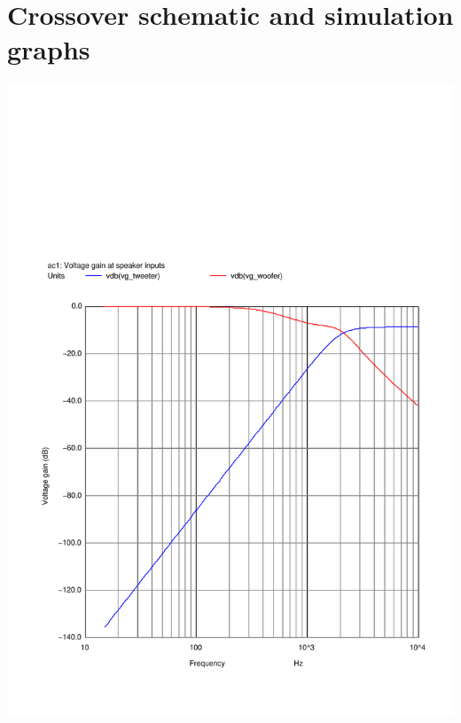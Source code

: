 \documentclass[10pt]{article}
\begin{document}
\pagebreak
\null
\vfil
\centering\section{Crossover schematic and simulation graphs}
\vfil
\pagebreak

\begin{multicols}{2}
	\includegraphics[scale=0.35,page=1]{../crossover/ngspice/gain.pdf}

\end{multicols}
\end{document}
